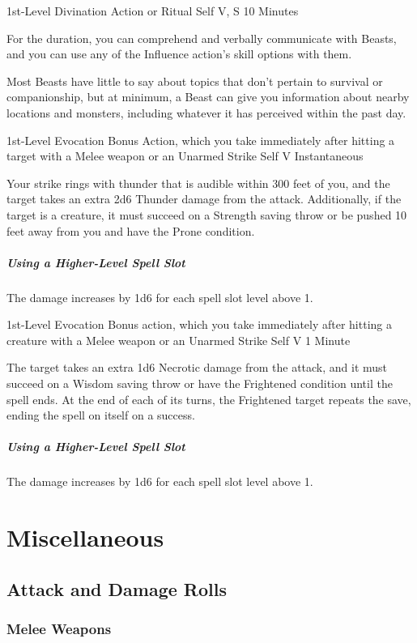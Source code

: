 \documentclass[letterpaper,openany,oneside,twocolumn]{book}
\begin{document}
	{1st-Level Divination}
	{Action or Ritual}
	{Self}
	{V, S}
	{10 Minutes}

For the duration, you can comprehend and verbally communicate with Beasts, and you can use any of the Influence action's skill options with them.

Most Beasts have little to say about topics that don't pertain to survival or companionship, but at minimum, a Beast can give you information about nearby locations and monsters, including whatever it has perceived within the past day.

	{1st-Level Evocation}
	{Bonus Action, which you take immediately after hitting a target with a Melee weapon or an Unarmed Strike}
	{Self}
	{V}
	{Instantaneous}

Your strike rings with thunder that is audible within 300 feet of you, and the target takes an extra 2d6 Thunder damage from the attack. Additionally, if the target is a creature, it must succeed on a Strength saving throw or be pushed 10 feet away from you and have the Prone condition.

\subparagraph*{Using a Higher-Level Spell Slot} The damage increases by 1d6 for each spell slot level above 1.

	{1st-Level Evocation}
	{Bonus action, which you take immediately after hitting a creature with a Melee weapon or an Unarmed Strike}
	{Self}
	{V}
	{1 Minute}

The target takes an extra 1d6 Necrotic damage from the attack, and it must succeed on a Wisdom saving throw or have the Frightened condition until the spell ends. At the end of each of its turns, the Frightened target repeats the save, ending the spell on itself on a success.

\subparagraph*{Using a Higher-Level Spell Slot} The damage increases by 1d6 for each spell slot level above 1.

\vfill\eject

\section*{Miscellaneous}
\subsection*{Attack and Damage Rolls}
\subsubsection*{Melee Weapons}
\end{document}
